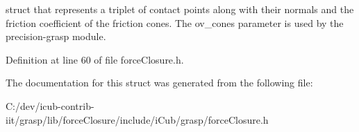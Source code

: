 struct that represents a triplet of contact points along with their normals and the friction coefficient of the friction cones. The ov\+\_\+cones parameter is used by the precision-\/grasp module. 

Definition at line 60 of file force\+Closure.\+h.



The documentation for this struct was generated from the following file\+:\begin{DoxyCompactItemize}
\item 
C\+:/dev/icub-\/contrib-\/iit/grasp/lib/force\+Closure/include/i\+Cub/grasp/force\+Closure.\+h\end{DoxyCompactItemize}
